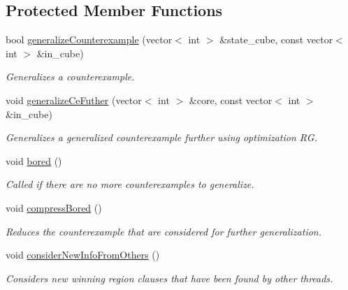 \subsection*{Protected Member Functions}
\begin{DoxyCompactItemize}
\item 
bool \hyperlink{classCounterGenSAT_a4d04e042ba7ec4b12bab4481fa3d6930}{generalize\-Counterexample} (vector$<$ int $>$ \&state\-\_\-cube, const vector$<$ int $>$ \&in\-\_\-cube)
\begin{DoxyCompactList}\small\item\em Generalizes a counterexample. \end{DoxyCompactList}\item 
void \hyperlink{classCounterGenSAT_a02a8ff723425a617ec93cf247c5e13b3}{generalize\-Ce\-Futher} (vector$<$ int $>$ \&core, const vector$<$ int $>$ \&in\-\_\-cube)
\begin{DoxyCompactList}\small\item\em Generalizes a generalized counterexample further using optimization R\-G. \end{DoxyCompactList}\item 
void \hyperlink{classCounterGenSAT_ad081c192451d0f9004eaa9cf8a482626}{bored} ()
\begin{DoxyCompactList}\small\item\em Called if there are no more counterexamples to generalize. \end{DoxyCompactList}\item 
void \hyperlink{classCounterGenSAT_ae696c35988d55e29d5a54b3c71547c12}{compress\-Bored} ()
\begin{DoxyCompactList}\small\item\em Reduces the counterexample that are considered for further generalization. \end{DoxyCompactList}\item 
void \hyperlink{classCounterGenSAT_a53ed27c0ed65807b1ef6b5180354a0b9}{consider\-New\-Info\-From\-Others} ()
\begin{DoxyCompactList}\small\item\em Considers new winning region clauses that have been found by other threads. \end{DoxyCompactList}\end{DoxyCompactItemize}
